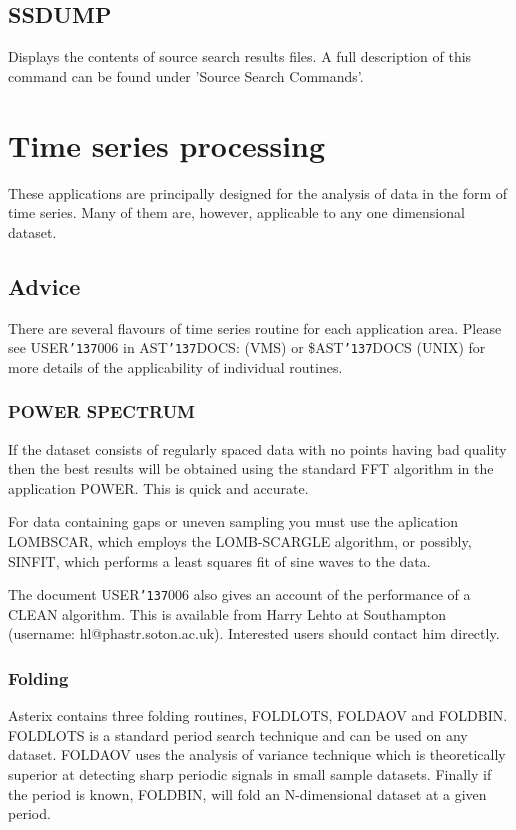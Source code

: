 \documentclass{book}
\renewcommand{\_}{{\tt\char'137}}     %
\begin{document}
\section{SSDUMP}
Displays the contents of source search results files. A full
description of this command can be found under 'Source Search
Commands'.
 
\chapter{Time series processing}
These applications are principally designed for the analysis of
data in the form of time series. Many of them are, however,
applicable to any one dimensional dataset.
 
\section{Advice}
There are several flavours of time series routine for each
application area. Please see USER\_006 in AST\_DOCS: (VMS) or
\$AST\_DOCS (UNIX) for more details of the applicability of
individual routines.
\subsection{POWER SPECTRUM}
If the dataset consists of regularly spaced data with no points
having bad quality then the best results will be obtained using
the standard FFT algorithm in the application POWER. This is quick
and accurate.
 
For data containing gaps or uneven sampling you must use the
aplication LOMBSCAR, which employs the LOMB-SCARGLE algorithm, or
possibly, SINFIT, which performs a least squares fit of sine waves
to the data.
 
The document USER\_006 also gives an account of the performance
of a CLEAN algorithm. This is available from Harry Lehto at
Southampton (username: hl@phastr.soton.ac.uk). Interested users should
contact him directly.
 
\subsection{Folding}
Asterix contains three folding routines, FOLDLOTS, FOLDAOV and
FOLDBIN. FOLDLOTS is a standard period search technique and can
be used on any dataset. FOLDAOV uses the analysis of variance
technique which is theoretically superior at detecting sharp
periodic signals in small sample datasets. Finally if the period
is known, FOLDBIN, will fold an N-dimensional dataset at a given
period.
 
\end{document}
